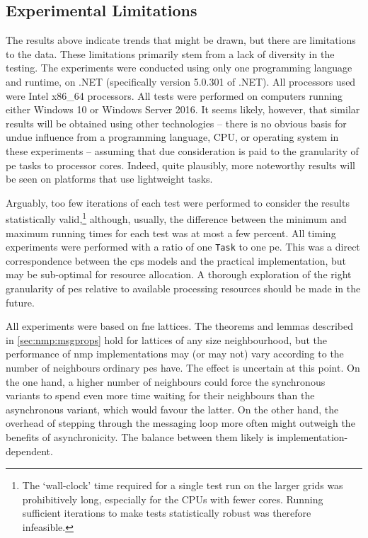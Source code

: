 \subsection{Experimental Limitations}
The results above indicate trends that might be drawn, but there are limitations to the data.  These limitations primarily stem from a lack of diversity in the testing.  The experiments were conducted using only one programming language and runtime, \csharp{} on .NET (specifically version 5.0.301 of .NET).  All processors used were Intel\textsuperscript{\textregistered} x86\_64 processors.  All tests were performed on computers running either Windows 10 or Windows Server 2016.  It seems likely, however, that similar results will be obtained using other technologies -- there is no obvious basis for undue influence from a programming language, CPU, or operating system in these experiments -- assuming that due consideration is paid to the granularity of \gls{pe} tasks to processor cores.  Indeed, quite plausibly, more noteworthy results will be seen on platforms that use lightweight tasks.

Arguably, too few iterations of each test were performed to consider the results statistically valid,\footnote{The `wall-clock' time required for a single test run on the larger grids was prohibitively long, especially for the CPUs with fewer cores.  Running sufficient iterations to make tests statistically robust was therefore infeasible.} although, usually, the difference between the minimum and maximum running times for each test was at most a few percent.  All timing experiments were performed with a ratio of one \texttt{Task} to one \gls{pe}.  This was a direct correspondence between the \gls{cps} models and the practical implementation, but may be sub-optimal for resource allocation.  A thorough exploration of the right granularity of \glspl{pe} relative to available processing resources should be made in the future.

All experiments were based on \gls{fne} lattices.  The theorems and lemmas described in \cref{sec:nmp:msgprops} hold for lattices of any size neighbourhood, but the performance of \gls{nmp} implementations may (or may not) vary according to the number of neighbours ordinary \glspl{pe} have.  The effect is uncertain at this point.  On the one hand, a higher number of neighbours could force the synchronous variants to spend even more time waiting for their neighbours than the asynchronous variant, which would favour the latter.  On the other hand, the overhead of stepping through the messaging loop more often might outweigh the benefits of asynchronicity.  The balance between them likely is implementation-dependent.